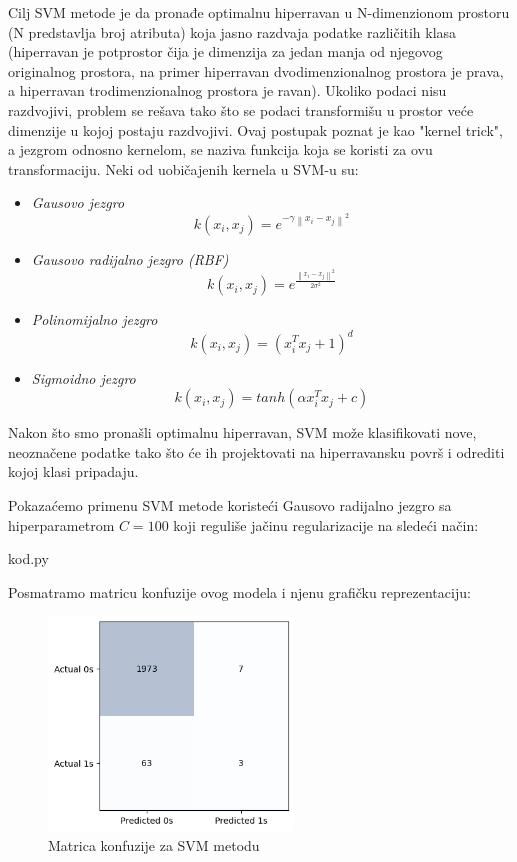 \documentclass[12pt]{article}
\theoremstyle{definition}
\theoremstyle{remark}
\begin{document}
Cilj SVM metode je da pronađe optimalnu hiperravan u N-dimenzionom prostoru (N predstavlja broj atributa) koja jasno razdvaja podatke različitih klasa (hiperravan je potprostor čija je dimenzija za jedan manja od njegovog originalnog prostora, na primer hiperravan dvodimenzionalnog prostora je prava, a hiperravan trodimenzionalnog prostora je ravan).
Ukoliko podaci nisu razdvojivi, problem se rešava tako što se podaci transformišu u prostor veće dimenzije u kojoj postaju razdvojivi. Ovaj postupak poznat je kao "kernel trick", a jezgrom odnosno kernelom, se naziva funkcija koja se koristi za ovu transformaciju. Neki od uobičajenih kernela u SVM-u su:

\begin{itemize}
    \item \emph{Gausovo jezgro} 
    \begingroup
        \large
        $$k(x_i,x_j) = e^{-\gamma \left \|x_i - x_j\right \|^2}$$
    \endgroup
    \item \emph{Gausovo radijalno jezgro (RBF)} 
    \begingroup
        \large
        $$k(x_i,x_j) = e^{\frac{\left \|x_i - x_j\right \|^2}{2\sigma ^2}}$$
    \endgroup
    \item \emph{Polinomijalno jezgro} 
    \begingroup
        \large
        $$k(x_i,x_j) = (x_i^T x_j+1)^d$$
    \endgroup
    \item \emph{Sigmoidno jezgro} 
    \begingroup
        \large
        $$k(x_i,x_j) = tanh(\alpha x_i^T x_j+c)$$
    \endgroup
\end{itemize}


Nakon što smo pronašli optimalnu hiperravan, SVM može klasifikovati nove, neoznačene podatke tako što će ih projektovati na hiperravansku površ i odrediti kojoj klasi pripadaju.

Pokazaćemo primenu SVM metode koristeći Gausovo radijalno jezgro sa hiperparametrom $C=100$ koji reguliše jačinu regularizacije na sledeći način:


\hfill

{kod.py}

\hfill

Posmatramo matricu konfuzije ovog modela i njenu grafičku reprezentaciju:

\begin{figure}[htp]
    \centering
    \includegraphics[width=6.5cm]{output_74_0.png}
    \caption{Matrica konfuzije za SVM metodu}
    \label{fig:galaxy}
\end{figure}
\end{document}
